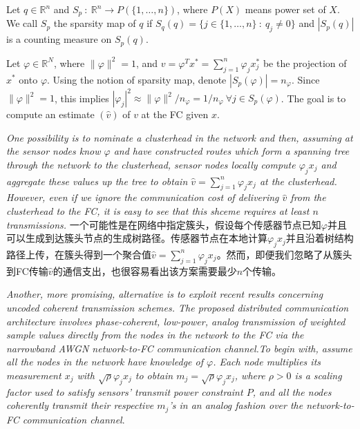 \begin{definition}
    \label{def2.1.1}
    Let $q\in\mathbb{R}^n$ and $S_p\ :\ \mathbb{R}^n \rightarrow P (\{1,\dots,n\})$, where $P(X)$ means power set of $X$. We call $S_{p}$ the sparsity map of $q$ if $S_q(q)=\{j \in \{1,\dots,n\}\ :\ q_j\neq0\}$ and $|S_p(q)|$ is a counting measure on $S_p(q)$.
\end{definition} 

Let $\varphi \in \mathbb{R}^N$, where $\|\varphi\|^2=1$, and $v = \varphi^Tx^* = \sum_{j=1}^{n}\varphi_jx_j^*$ be the projection of $x^*$ onto $\varphi$. Using the notion of sparsity map, denote $|S_p(\varphi)| = n_{\varphi}$. Since $\|\varphi\|^2 = 1$, this implies $|\varphi_j|^2 \approx \|\varphi\|^2/n_{\varphi}=1/n_{\varphi} \ \forall j \in S_p(\varphi)$. The goal is to compute an estimate $(\hat{v})$ of $v$ at the FC given $x$.

\emph{\textcolor[rgb]{1,0,0}{One possibility is to nominate a clusterhead in the network and then, assuming at the sensor nodes know $\varphi$ and have constructed routes which form a spanning tree through the network to the clusterhead, sensor nodes locally compute $\varphi_j x_j$ and aggregate these values up the tree to obtain $\hat{v} = \sum_{j=1}^{n}\varphi_jx_j$ at the clusterhead. However, even if we ignore the communication cost of delivering $\hat{v}$ from the clusterhead to the FC, it is easy to see that this shceme requires at least $n$ transmissions.}} 一个可能性是在网络中指定簇头，假设每个传感器节点已知$\varphi$并且可以生成到达簇头节点的生成树路径。传感器节点在本地计算$\varphi_jx_j$并且沿着树结构路径上传，在簇头得到一个聚合值$\hat{v}=\sum_{j=1}^{n}\varphi_jx_j$。然而，即便我们忽略了从簇头到FC传输$\hat{v}$的通信支出，也很容易看出该方案需要最少$n$个传输。

\emph{\textcolor[rgb]{1,0,0}{Another, more promising, alternative is to exploit recent results concerning uncoded coherent transmission schemes. The proposed distributed communication architecture involves phase-coherent, low-power, analog transmission of weighted sample values directly from the nodes in the network to the FC via the narrowband AWGN network-to-FC communication channel.To begin with, assume all the nodes in the network have knowledge of $\varphi$. Each node multiplies its measurement $x_j$ with $\sqrt{\rho}\varphi_jx_j$ to obtain $m_j=\sqrt{\rho}\varphi_jx_j$, where $\rho>0$ is a scaling factor used to satisfy sensors' transmit power constraint $P$, and all the nodes coherently transmit their respective $m_j$'s in an analog fashion over the network-to-FC communication channel}}.

